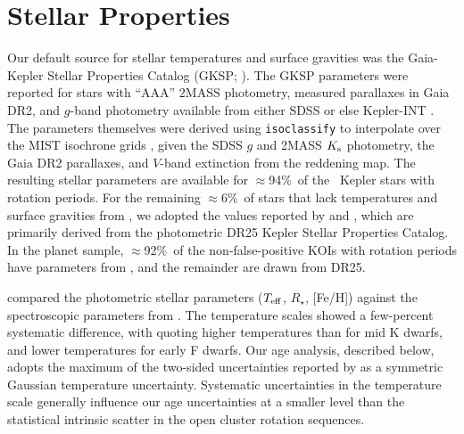 \documentclass[11pt,twocolumn,tighten]{aastex63}
\newcommand{\fracstarswithprotwithbtwenty}{{$\approx$94\%}}
\newcommand{\fracstarswithprotwithoutbtwenty}{{$\approx$6\%}}
\newcommand{\frackoisnofpwithprotwithbtwenty}{{$\approx$92\%}}
\begin{document}
\section{Stellar Properties}
\label{sec:stellarprops}




Our default source for stellar temperatures and surface gravities was
the Gaia-Kepler Stellar Properties Catalog (GKSP;
\citealt{Berger_2020a_catalog}).  The GKSP parameters were reported
for stars with ``AAA'' 2MASS photometry, measured parallaxes in Gaia
DR2,  and $g$-band photometry available from either SDSS or else
Kepler-INT \citep{2012AJ....144...24G}.  The parameters themselves
were derived using \texttt{isoclassify} \citep{2017ApJ...844..102H} to
interpolate over the MIST isochrone grids
\citep{Choi_2016,2016ApJS..222....8D}, given the SDSS $g$ and 2MASS
$K_{\rm s}$ photometry, the Gaia DR2 parallaxes, and $V$-band
extinction from the \citet{2019ApJ...887...93G} reddening map.  The
resulting stellar parameters are available for
\fracstarswithprotwithbtwenty\ of the \nuniqstarsantosrot\ Kepler
stars with rotation periods.  For the remaining
\fracstarswithprotwithoutbtwenty\ of stars that lack temperatures and
surface gravities from , we adopted
the values reported by \citet{Santos_2019} and \citet{Santos_2021},
which are primarily derived from the photometric \citet{Mathur_2017}
DR25 Kepler Stellar Properties Catalog.  In the planet sample,
\frackoisnofpwithprotwithbtwenty\ of the non-false-positive KOIs with
rotation periods have parameters from \citet{Berger_2020a_catalog},
and the remainder are drawn from DR25. 

\citet{David_2021} compared the photometric
 stellar parameters ($T_{\rm eff}$,
$R_\star$, [Fe/H]) against the spectroscopic parameters from
\citet{Fulton_2018}.  The temperature scales showed a few-percent
systematic difference, with  quoting higher
temperatures than  for mid K dwarfs,
and lower temperatures for early F dwarfs.  Our age analysis,
described below, adopts the maximum of the two-sided uncertainties
reported by  as a symmetric Gaussian
temperature uncertainty.  Systematic uncertainties in the temperature
scale generally influence our age uncertainties at a smaller level
than the statistical intrinsic scatter in the open cluster rotation
sequences.
\end{document}
